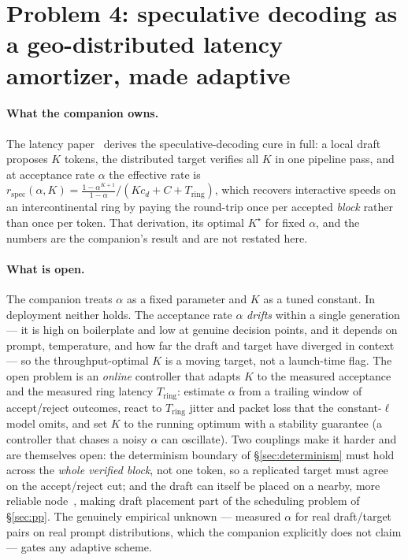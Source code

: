 \documentclass[11pt]{article}
\newcommand{\Tring}{\ensuremath{T_{\mathrm{ring}}}}
\begin{document}
\section{Problem 4: speculative decoding as a geo-distributed latency amortizer, made adaptive}
\label{sec:spec}

\paragraph{What the companion owns.} The latency paper~\cite{latency} derives the speculative-decoding
cure in full: a local draft proposes $K$ tokens, the distributed target verifies all $K$ in one pipeline
pass, and at acceptance rate $\alpha$ the effective rate is
$r_{\mathrm{spec}}(\alpha,K)=\frac{1-\alpha^{K+1}}{1-\alpha}\big/(Kc_d+C+\Tring)$, which recovers
interactive speeds on an intercontinental ring by paying the round-trip once per accepted \emph{block}
rather than once per token. That derivation, its optimal $K^\star$ for fixed $\alpha$, and the numbers are
the companion's result and are not restated here.

\paragraph{What is open.} The companion treats $\alpha$ as a fixed parameter and $K$ as a tuned constant.
In deployment neither holds. The acceptance rate $\alpha$ \emph{drifts} within a single generation --- it
is high on boilerplate and low at genuine decision points, and it depends on prompt, temperature, and how
far the draft and target have diverged in context --- so the throughput-optimal $K$ is a moving target,
not a launch-time flag. The open problem is an \emph{online} controller that adapts $K$ to the measured
acceptance and the measured ring latency $\Tring$: estimate $\alpha$ from a trailing window of
accept/reject outcomes, react to $\Tring$ jitter and packet loss that the constant-$\ell$ model omits, and
set $K$ to the running optimum with a stability guarantee (a controller that chases a noisy $\alpha$ can
oscillate). Two couplings make it harder and are themselves open: the determinism boundary of
\S\ref{sec:determinism} must hold across the \emph{whole verified block}, not one token, so a replicated
target must agree on the accept/reject cut; and the draft can itself be placed on a nearby, more reliable
node~\cite{consensus}, making draft placement part of the scheduling problem of \S\ref{sec:pp}. The
genuinely empirical unknown --- measured $\alpha$ for real draft/target pairs on real prompt distributions,
which the companion explicitly does not claim --- gates any adaptive scheme.
\end{document}
